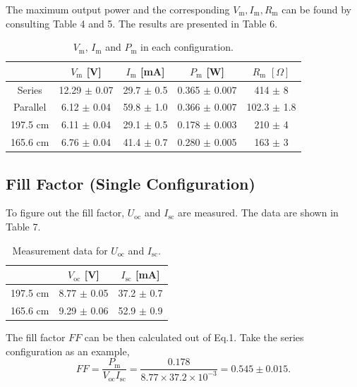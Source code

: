 \documentclass{article}
\begin{document}
{The maximum output power and the corresponding $V_\text{m}, I_\text{m}, R_\text{m}$ can be found by consulting Table 4 and 5. The results are presented in Table 6.

\begin{table}[H]\centering
    \begin{tabular}{ccccc}
        \toprule
                 & $V_\text{m}$ [V] & $I_\text{m}$ [mA] & $P_\text{m}$ [W]   & $R_\text{m}\,\,[\Omega]$ \\
        \midrule
        Series   & 12.29 $\pm$ 0.07 & 29.7 $\pm$ 0.5    & 0.365  $\pm$ 0.007 & 414   $\pm$ 8            \\
        Parallel & 6.12  $\pm$ 0.04 & 59.8 $\pm$ 1.0    & 0.366  $\pm$ 0.007 & 102.3 $\pm$ 1.8          \\
        197.5 cm & 6.11  $\pm$ 0.04 & 29.1 $\pm$ 0.5    & 0.178  $\pm$ 0.003 & 210   $\pm$ 4            \\
        165.6 cm & 6.76  $\pm$ 0.04 & 41.4 $\pm$ 0.7    & 0.280  $\pm$ 0.005 & 163   $\pm$ 3            \\
        \bottomrule
    \end{tabular}
    \caption{$V_\text{m}$, $I_\text{m}$ and $P_\text{m}$ in each configuration.}\label{tab:Pmax}
\end{table}

\subsection{Fill Factor (Single Configuration)}

To figure out the fill factor, $U_\text{oc}$ and $I_\text{sc}$ are measured. The data are shown in Table 7.

\begin{table}[H]
    \centering
    \begin{tabular}{ccc}
        \toprule
                 & $V_\text{oc}$ [V]  & $I_\text{sc}$ [mA] \\
        \midrule
        197.5 cm & 8.77    $\pm$ 0.05 & 37.2 $\pm$ 0.7     \\
        165.6 cm & 9.29    $\pm$ 0.06 & 52.9 $\pm$ 0.9     \\
        \bottomrule
    \end{tabular}
    \caption{Measurement data for $U_\text{oc}$ and $I_\text{sc}$.}\label{tab:ocsc}
\end{table}

The fill factor $FF$ can be then calculated out of Eq.1. Take the series configuration as an example,
$$FF = \frac{P_\text{m}}{V_\text{oc}I_\text{sc}} = \frac{0.178}{8.77\times 37.2\times 10^{-3}} = 0.545 \pm 0.015.$$

}
\end{document}
